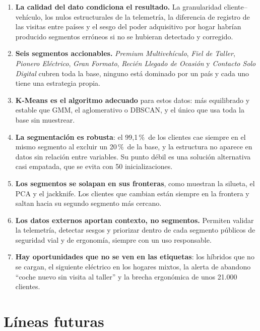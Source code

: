 \documentclass[11pt,a4paper]{article}
\newcommand{\pct}{\,\%}
\newcommand{\seg}[1]{\textit{#1}}
\begin{document}
\begin{enumerate}
  \item \textbf{La calidad del dato condiciona el resultado.} La granularidad cliente--vehículo, los nulos estructurales
        de la telemetría, la diferencia de registro de las visitas entre países y el sesgo del poder adquisitivo por
        hogar habrían producido segmentos erróneos si no se hubieran detectado y corregido.
  \item \textbf{Seis segmentos accionables.} \seg{Premium Multivehículo}, \seg{Fiel de Taller}, \seg{Pionero Eléctrico},
        \seg{Gran Formato}, \seg{Recién Llegado de Ocasión} y \seg{Contacto Solo Digital} cubren toda la base, ninguno
        está dominado por un país y cada uno tiene una estrategia propia.
  \item \textbf{K-Means es el algoritmo adecuado} para estos datos: más equilibrado y estable que GMM, el aglomerativo o
        DBSCAN, y el único que usa toda la base sin muestrear.
  \item \textbf{La segmentación es robusta}: el 99,1\pct\ de los clientes cae siempre en el mismo segmento al excluir un
        20\pct\ de la base, y la estructura no aparece en datos sin relación entre variables. Su punto débil es una
        solución alternativa casi empatada, que se evita con 50 inicializaciones.
  \item \textbf{Los segmentos se solapan en sus fronteras}, como muestran la silueta, el PCA y el jackknife. Los
        clientes que cambian están siempre en la frontera y saltan hacia su segundo segmento más cercano.
  \item \textbf{Los datos externos aportan contexto, no segmentos.} Permiten validar la telemetría, detectar sesgos y
        priorizar dentro de cada segmento públicos de seguridad vial y de ergonomía, siempre con un uso responsable.
  \item \textbf{Hay oportunidades que no se ven en las etiquetas}: los híbridos que no se cargan, el siguiente eléctrico
        en los hogares mixtos, la alerta de abandono \enquote{coche nuevo sin visita al taller} y la brecha ergonómica de
        unos 21.000 clientes.
\end{enumerate}

\section{Líneas futuras}\label{sec:futuro}
\end{document}
